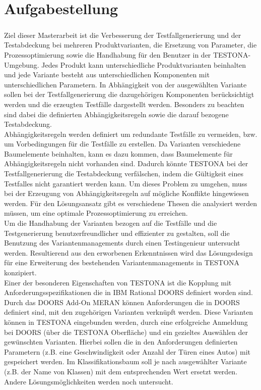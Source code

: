 
\chapter{Aufgabestellung}\label{chp:aufgabenstellung}
\paragraph{}

Ziel dieser Masterarbeit ist die Verbesserung der Testfallgenerierung und der Testabdeckung bei mehreren Produktvarianten, die Ersetzung von Parameter, die Prozessoptimierung sowie die Handhabung für den Benutzer in der TESTONA-Umgebung. Jedes Produkt kann unterschiedliche Produktvarianten beinhalten und jede Variante besteht aus unterschiedlichen Komponenten mit unterschiedlichen Parametern. In Abhängigkeit von der ausgewählten Variante sollen bei der Testfallgenerierung die dazugehörigen Komponenten berücksichtigt werden und die erzeugten Testfälle dargestellt werden. Besonders zu beachten sind dabei die definierten Abhängigkeitsregeln sowie die darauf bezogene Testabdeckung.\\

Abhängigkeitsregeln werden definiert um redundante Testfälle zu vermeiden, bzw. um Vorbedingungen für die Testfälle zu erstellen. Da Varianten verschiedene Baumelemente beinhalten, kann es dazu kommen, dass Baumelemente für Abhängigkeitsregeln nicht vorhanden sind. Dadurch könnte TESTONA bei der Testfallgenerierung die Testabdeckung verfälschen, indem die Gültigkeit eines Testfalles nicht garantiert werden kann. Um dieses Problem zu umgehen, muss bei der Erzeugung von Abhängigkeitsregeln auf mögliche Konflikte hingewiesen werden. Für den Lösungsansatz gibt es verschiedene Thesen die analysiert werden müssen, um eine optimale Prozessoptimierung zu erreichen.\\

Um die Handhabung der Varianten bezogen auf die Testfälle und die Testgenerierung benutzerfreundlicher und effizienter zu gestalten, soll die Benutzung des Variantenmanagements durch einen Testingenieur untersucht werden. Resultierend aus den erworbenen Erkenntnissen wird das Lösungsdesign für eine Erweiterung des bestehenden Variantenmanagements in TESTONA konzipiert.\\

Einer der besonderen Eigenschaften von TESTONA ist die Kopplung mit Anforderungsspezifikationen die in IBM Rational DOORS definiert worden sind. Durch das DOORS Add-On MERAN können Anforderungen die in DOORS definiert sind, mit den zugehörigen Varianten verknüpft werden. Diese Varianten können in TESTONA eingebunden werden, durch eine erfolgreiche Anmeldung bei DOORS (über die TESTONA Oberfläche) und ein gezieltes Auswählen der gewünschten Varianten. Hierbei sollen die in den Anforderungen definierten Parametern (z.B. eine Geschwindigkeit oder Anzahl der Türen eines Autos) mit gespeichert werden. Im Klassifikationsbaum soll je nach ausgewählter Variante (z.B. der Name von Klassen) mit dem entsprechenden Wert ersetzt werden. Andere Lösungsmöglichkeiten werden noch untersucht.\\

